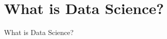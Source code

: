 \newcommand\chapternumber{1}

\usepackage{enumerate}
\usepackage{float}



\section*{What is Data Science?}

What is Data Science?

